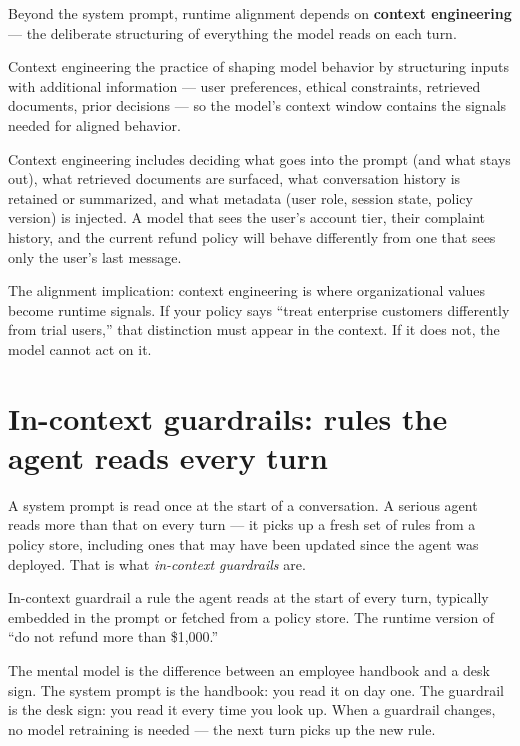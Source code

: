 Beyond the system prompt, runtime alignment depends on \textbf{context engineering} --- the deliberate structuring of everything the model reads on each turn.

\begin{TNdefinition}{Context engineering} the practice of shaping model behavior by structuring inputs with additional information --- user preferences, ethical constraints, retrieved documents, prior decisions --- so the model's context window contains the signals needed for aligned behavior. \end{TNdefinition}

Context engineering includes deciding what goes into the prompt (and what stays out), what retrieved documents are surfaced, what conversation history is retained or summarized, and what metadata (user role, session state, policy version) is injected. A model that sees the user's account tier, their complaint history, and the current refund policy will behave differently from one that sees only the user's last message.

The alignment implication: context engineering is where organizational values become runtime signals. If your policy says ``treat enterprise customers differently from trial users,'' that distinction must appear in the context. If it does not, the model cannot act on it.

\section{In-context guardrails: rules the agent reads every turn}

A system prompt is read once at the start of a conversation. A serious agent reads more than that on every turn --- it picks up a fresh set of rules from a policy store, including ones that may have been updated since the agent was deployed. That is what \textit{in-context guardrails} are.

\begin{TNdefinition}{In-context guardrail} a rule the agent reads at the start of every turn, typically embedded in the prompt or fetched from a policy store. The runtime version of ``do not refund more than \$1,000.'' \end{TNdefinition}

The mental model is the difference between an employee handbook and a desk sign. The system prompt is the handbook: you read it on day one. The guardrail is the desk sign: you read it every time you look up. When a guardrail changes, no model retraining is needed --- the next turn picks up the new rule.

